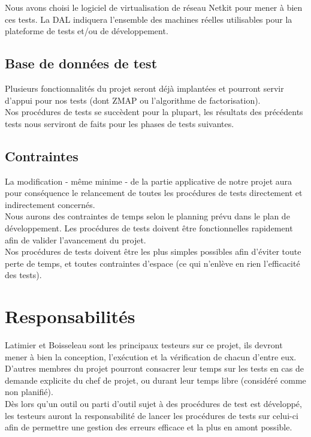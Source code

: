 \documentclass[a4paper,11pt,french]{article}
\begin{document}
Nous avons choisi le logiciel de virtualisation de réseau Netkit pour mener à bien ces tests. La DAL indiquera l'ensemble des machines réelles utilisables pour la plateforme de tests et/ou de développement.

\subsection{Base de données de test}

Plusieurs fonctionnalités du projet seront déjà implantées et pourront servir d'appui pour nos tests (dont ZMAP ou l'algorithme de factorisation).\\

Nos procédures de tests se succèdent pour la plupart, les résultats des précédents tests nous serviront de faits pour les phases de tests suivantes.

\subsection{Contraintes}

La modification - même minime - de la partie applicative de notre projet aura pour conséquence le relancement de toutes les procédures de tests directement et indirectement concernés.\\

Nous aurons des contraintes de temps selon le planning prévu dans le plan de développement. Les procédures de tests doivent être fonctionnelles rapidement afin de valider l'avancement du projet.\\

Nos procédures de tests doivent être les plus simples possibles afin d'éviter toute perte de temps, et toutes contraintes d'espace (ce qui n'enlève en rien l'efficacité des tests).


\section{Responsabilités}
Latimier et Boisseleau sont les principaux testeurs sur ce projet, ils devront mener à bien la conception, l'exécution et la vérification de chacun d'entre eux. D'autres membres du projet pourront consacrer leur temps sur les tests en cas de demande explicite du chef de projet, ou durant leur temps libre (considéré comme non planifié).\\


Dès lors qu'un outil ou parti d'outil sujet à des procédures de test est développé, les testeurs auront la responsabilité de lancer les procédures de tests sur celui-ci afin de permettre une gestion des erreurs efficace et la plus en amont possible.  \\
\end{document}
